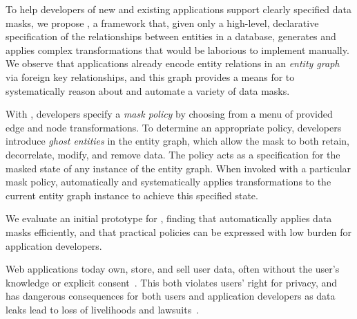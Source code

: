 To help developers of new and existing applications support clearly specified data masks, we propose
\sys, a framework that, given only a high-level, declarative specification of the relationships
between entities in a database, generates and applies complex transformations that would be
laborious to implement manually. We observe that applications already encode entity
relations in an \emph{entity graph} via foreign key relationships, and this graph provides a means
for \sys to systematically reason about and automate a variety of data masks.

With \sys, developers specify a \emph{mask policy} by choosing from a menu of provided edge and node
transformations. To determine an appropriate policy, developers introduce \emph{ghost entities} in the entity graph, which allow the mask to both retain, decorrelate, modify,
and remove data. The policy acts as a specification for the masked state of any instance of the
entity graph. When invoked with a particular mask policy, \sys automatically and systematically
applies transformations to the current entity graph instance to achieve this specified state.

We evaluate an initial prototype for \sys, finding that \sys automatically applies
data masks efficiently, and that practical policies can be expressed with low burden for application
developers.
\fi

\iffalse
%
%
Web applications today own, store, and sell user data, often without the user's knowledge or
explicit consent~\cite{nytimes:fb, npr:data}. This both violates users' right for privacy, and has
dangerous consequences for both users and application developers as data leaks lead to loss of
livelihoods and lawsuits~\cite{breach:amazon,breach:twitter, breach:fb, breach:marriott,
breach:quora}.

